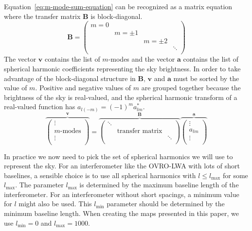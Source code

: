 \documentclass[twocolumn]{aastex6}
\renewcommand{\b}{\pmb}
\begin{document}
Equation~\ref{eq:m-mode-sum-equation} can be recognized as a matrix equation where the transfer
matrix $\b B$ is block-diagonal.
\begin{equation}
    \b B = \left(\begin{array}{cccc}
        m = 0 &&& \\
              & m=\pm1 && \\
              && m=\pm2 & \\
              &&& \ddots \\
    \end{array}\right)
\end{equation}
The vector $\b v$ contains the list of $m$-modes and the vector $\b a$ contains the list of
spherical harmonic coefficients representing the sky brightness. In order to take advantage of the
block-diagonal structure in $\b B$, $\b v$ and $\b a$ must be sorted by the value of $m$. Positive
and negative values of $m$ are grouped together because the brightness of the sky is real-valued,
and the spherical harmonic transform of a real-valued function has $a_{l(-m)} = (-1)^m a_{lm}^*$.
\begin{equation}\label{eq:m-mode-matrix-equation}
    \overbrace{\left(
        \begin{array}{c}
            \vdots \\
            m\text{-modes} \\
            \vdots \\
        \end{array}
    \right)}^{\b v}
    =
    \overbrace{\left(
        \begin{array}{ccc}
            \ddots & & \\
            & \text{transfer matrix} & \\
            & & \ddots \\
        \end{array}
    \right)}^{\b B}
    \overbrace{\left(
        \begin{array}{c}
            \vdots \\
            a_{lm} \\
            \vdots \\
        \end{array}
    \right)}^{\b a}
\end{equation}

In practice we now need to pick the set of spherical harmonics we will use to represent the sky. For
an interferometer like the OVRO-LWA with lots of short baselines, a sensible choice is to use all
spherical harmonics with $l\le l_\text{max}$ for some $l_\text{max}$. The parameter $l_\text{max}$
is determined by the maximum baseline length of the interferometer.  For an interferometer without
short spacings, a minimum value for $l$ might also be used. This $l_\text{min}$ parameter should be
determined by the minimum baseline length.  When creating the maps presented in this paper, we use
$l_\text{min} = 0$ and $l_\text{max} = 1000$.
\end{document}
